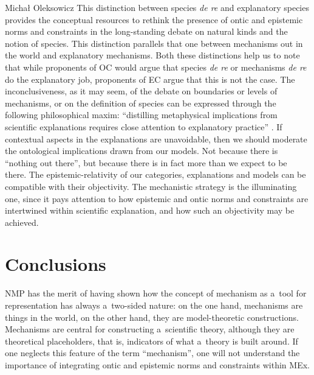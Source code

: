 \begin{artengenv}{Michał Oleksowicz}
This distinction between species \textit{de re} and explanatory species provides the conceptual resources to rethink the presence of ontic and epistemic norms and constraints in the long-standing debate on natural kinds and the notion of species. This distinction parallels that one between mechanisms out in the world and explanatory mechanisms. Both these distinctions help us to note that while proponents of OC would argue that species \textit{de re} or mechanisms \textit{de re} do the explanatory job, proponents of EC argue that this is not the case. The inconclusiveness, as it may seem, of the debate on boundaries or levels of mechanisms, or on the definition of species can be expressed through the following philosophical maxim: ``distilling metaphysical implications from scientific explanations requires close attention to explanatory practice''
\parencite[][p.773]{love_idealization_2015}. %
 If contextual aspects in the explanations are unavoidable, then we should moderate the ontological implications drawn from our models. Not because there is ``nothing out there'', but because there is in fact more than we expect to be there. The epistemic-relativity of our categories, explanations and models can be compatible with their objectivity. The mechanistic strategy is the illuminating one, since it pays attention to how epistemic and ontic norms and constraints are intertwined within scientific explanation, and how such an objectivity may be achieved.

\section*{Conclusions}
NMP has the merit of having shown how the concept of mechanism as a~tool for representation has always a~two-sided nature: on the one hand, mechanisms are things in the world, on the other hand, they are model-theoretic constructions. Mechanisms are central for constructing a~scientific theory, although they are theoretical placeholders, that is, indicators of what a~theory is built around. If one neglects this feature of the term ``mechanism'', one will not understand the importance of integrating ontic and epistemic norms and constraints within MEx.


\end{artengenv}
